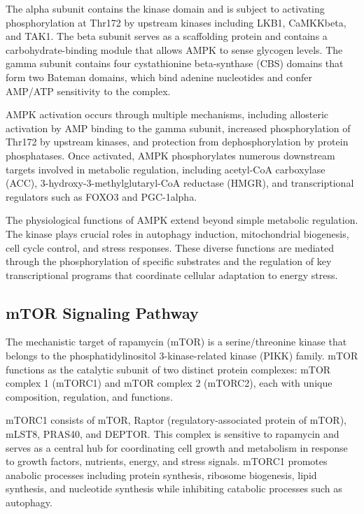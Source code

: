 \documentclass[11pt,a4paper]{article}
\begin{document}
The alpha subunit contains the kinase domain and is subject to activating phosphorylation at Thr172 by upstream kinases including LKB1, CaMKKbeta, and TAK1. The beta subunit serves as a scaffolding protein and contains a carbohydrate-binding module that allows AMPK to sense glycogen levels. The gamma subunit contains four cystathionine beta-synthase (CBS) domains that form two Bateman domains, which bind adenine nucleotides and confer AMP/ATP sensitivity to the complex.

AMPK activation occurs through multiple mechanisms, including allosteric activation by AMP binding to the gamma subunit, increased phosphorylation of Thr172 by upstream kinases, and protection from dephosphorylation by protein phosphatases. Once activated, AMPK phosphorylates numerous downstream targets involved in metabolic regulation, including acetyl-CoA carboxylase (ACC), 3-hydroxy-3-methylglutaryl-CoA reductase (HMGR), and transcriptional regulators such as FOXO3 and PGC-1alpha.

The physiological functions of AMPK extend beyond simple metabolic regulation. The kinase plays crucial roles in autophagy induction, mitochondrial biogenesis, cell cycle control, and stress responses. These diverse functions are mediated through the phosphorylation of specific substrates and the regulation of key transcriptional programs that coordinate cellular adaptation to energy stress.

\subsection{mTOR Signaling Pathway}

The mechanistic target of rapamycin (mTOR) is a serine/threonine kinase that belongs to the phosphatidylinositol 3-kinase-related kinase (PIKK) family. mTOR functions as the catalytic subunit of two distinct protein complexes: mTOR complex 1 (mTORC1) and mTOR complex 2 (mTORC2), each with unique composition, regulation, and functions.

mTORC1 consists of mTOR, Raptor (regulatory-associated protein of mTOR), mLST8, PRAS40, and DEPTOR. This complex is sensitive to rapamycin and serves as a central hub for coordinating cell growth and metabolism in response to growth factors, nutrients, energy, and stress signals. mTORC1 promotes anabolic processes including protein synthesis, ribosome biogenesis, lipid synthesis, and nucleotide synthesis while inhibiting catabolic processes such as autophagy.
\end{document}

